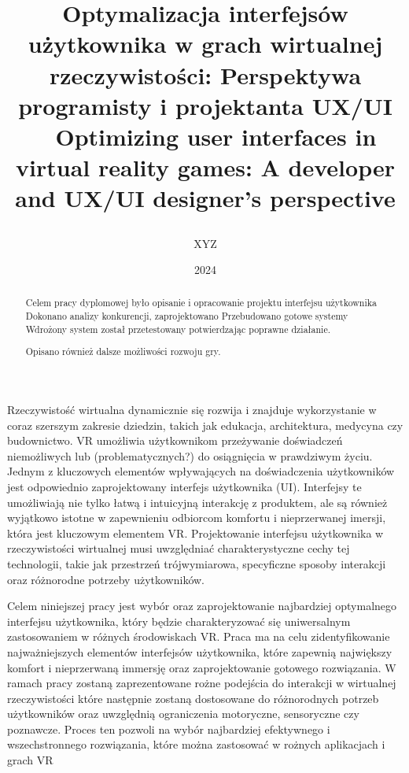 \documentclass[xodstep]{wnspt}
\author   {XYZ}
\date     {2024}
\title{\begin{LARGE}Optymalizacja interfejsów użytkownika w grach wirtualnej rzeczywistości: Perspektywa programisty i projektanta UX/UI
\\{~}
Optimizing user interfaces in virtual reality games: A developer and UX/UI designer's perspective
\end{LARGE}}
\begin{document}
\begin{abstract}
Celem pracy dyplomowej było opisanie i opracowanie projektu interfejsu użytkownika
Dokonano analizy konkurencji, zaprojektowano 
Przebudowano gotowe systemy
Wdrożony system został przetestowany potwierdzając poprawne działanie.


Opisano również dalsze możliwości rozwoju gry.
\end{abstract}

\maketitle

\onehalfspacing

\introduction

Rzeczywistość wirtualna dynamicznie się rozwija i znajduje wykorzystanie w coraz szerszym zakresie dziedzin, takich jak edukacja, architektura, medycyna czy budownictwo. VR umożliwia użytkownikom przeżywanie doświadczeń niemożliwych lub (problematycznych?) do osiągnięcia w prawdziwym życiu. 
Jednym z kluczowych elementów wpływających na doświadczenia użytkowników jest odpowiednio zaprojektowany interfejs użytkownika (UI). Interfejsy te umożliwiają nie tylko łatwą i intuicyjną interakcję z produktem, ale są również wyjątkowo istotne w zapewnieniu odbiorcom komfortu i nieprzerwanej imersji, która jest kluczowym elementem VR. Projektowanie interfejsu użytkownika w rzeczywistości wirtualnej musi uwzględniać charakterystyczne cechy tej technologii, takie jak przestrzeń trójwymiarowa, specyficzne sposoby interakcji oraz różnorodne potrzeby użytkowników.

Celem niniejszej pracy jest wybór oraz zaprojektowanie najbardziej optymalnego interfejsu użytkownika, który będzie charakteryzować się uniwersalnym zastosowaniem w różnych środowiskach VR. Praca ma na celu zidentyfikowanie najważniejszych elementów interfejsów użytkownika, które zapewnią największy komfort i nieprzerwaną immersję oraz zaprojektowanie gotowego rozwiązania.
W ramach pracy zostaną zaprezentowane rożne podejścia do interakcji w wirtualnej rzeczywistości które następnie zostaną dostosowane do różnorodnych potrzeb użytkowników oraz uwzględnią ograniczenia motoryczne, sensoryczne czy poznawcze. Proces ten pozwoli na wybór najbardziej efektywnego i wszechstronnego rozwiązania, które można zastosować w rożnych aplikacjach i grach VR
\end{document}
